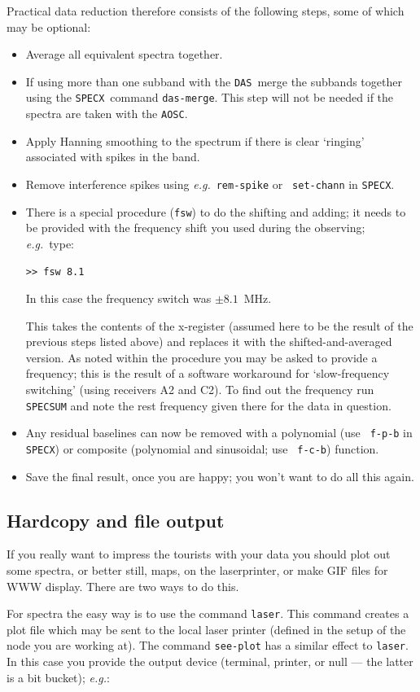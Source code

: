 \documentclass[11pt,twoside]{article}
\newcommand{\eg}{{\it e.g.}}
\newcommand{\SPECX}{{\tt SPECX}}
\newcommand{\das}{{\tt DAS}}
\newcommand{\aosc}{{\tt AOSC}}
\begin{document}
Practical data reduction therefore consists of the following steps,
some of which may be optional:
\begin{itemize}
\item
Average all equivalent spectra together.
\item
If using more than one subband with the \das\ merge the subbands
together using the \SPECX\ command {\tt das-merge}. This step will not
be needed if the spectra are taken with the \aosc .
\item
Apply Hanning smoothing to the spectrum if there is clear `ringing'
associated with spikes in the band.
\item
Remove interference spikes using \eg\ {\tt rem-spike} or {\tt
set-chann} in {\SPECX}.
\item
There is a special procedure ({\tt{fsw}}) to do the shifting and
adding; it needs to be provided with the frequency shift you used
during the observing; \eg\ type:

\verb|>> fsw 8.1|

In this case the frequency switch was $\pm8.1$~MHz.

This takes the contents of the x-register (assumed here to be the
result of the previous steps listed above) and replaces it with the
shifted-and-averaged version. As noted within the procedure you may be
asked to provide a frequency; this is the result of a software
workaround for `slow-frequency switching' (using receivers A2 and
C2). To find out the frequency run {\tt SPECSUM} and note the rest
frequency given there for the data in question.

\item
Any residual baselines can now be removed with a polynomial (use {\tt
f-p-b} in {\SPECX}) or composite (polynomial and sinusoidal; use {\tt
f-c-b}) function.
\item
Save the final result, once you are happy; you won't want to do all
this again.
\end{itemize}



\subsection{Hardcopy and file output}
\label{sec:specx_12}
If you really want to impress the tourists with your data you should
plot out some spectra, or better still, maps, on the laserprinter, or make
GIF files for WWW
display.  There are two ways to do this.

For spectra the easy way is to use the command {\tt laser}.  This command
creates
a plot file which may be sent to the local laser printer (defined in the
setup of the node you are working at).  The command {\tt see-plot} has
a similar effect to {\tt laser}. In this case you provide the output
device (terminal, printer, or null --- the latter is a bit bucket);
\eg :
\end{document}
